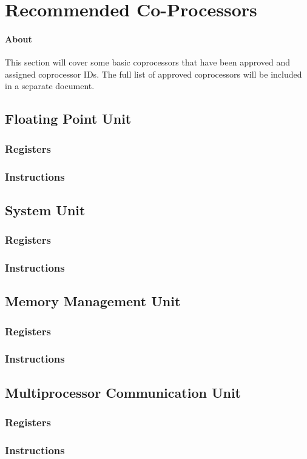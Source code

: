 \documentclass[letterpaper, 11pt]{article}
\begin{document}
\section{Recommended Co-Processors}
\paragraph{About} This section will cover some basic coprocessors that have been approved and assigned coprocessor IDs. The full list of approved coprocessors will be included in a separate document. 
\subsection{Floating Point Unit}
\subsubsection{Registers}
\subsubsection{Instructions}
\subsection{System Unit}
\subsubsection{Registers}
\subsubsection{Instructions}
\subsection{Memory Management Unit}
\subsubsection{Registers}
\subsubsection{Instructions}
\subsection{Multiprocessor Communication Unit}
\subsubsection{Registers}
\subsubsection{Instructions}
\end{document}

